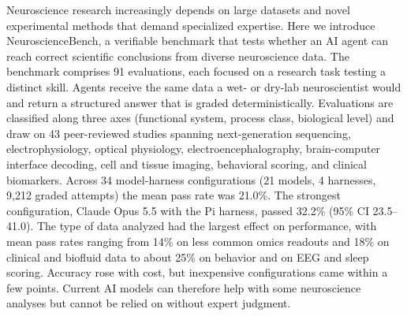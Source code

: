 Neuroscience research increasingly depends on large datasets and novel experimental methods that demand specialized expertise. Here we introduce NeuroscienceBench, a verifiable benchmark that tests whether an AI agent can reach correct scientific conclusions from diverse neuroscience data. The benchmark comprises 91 evaluations, each focused on a research task testing a distinct skill. Agents receive the same data a wet- or dry-lab neuroscientist would and return a structured answer that is graded deterministically. Evaluations are classified along three axes (functional system, process class, biological level) and draw on 43 peer-reviewed studies spanning next-generation sequencing, electrophysiology, optical physiology, electroencephalography, brain-computer interface decoding, cell and tissue imaging, behavioral scoring, and clinical biomarkers. Across 34 model-harness configurations (21 models, 4 harnesses, 9,212 graded attempts) the mean pass rate was 21.0\%. The strongest configuration, Claude Opus 5.5 with the Pi harness, passed 32.2\% (95\% CI \mbox{23.5--41.0}). The type of data analyzed had the largest effect on performance, with mean pass rates ranging from 14\% on less common omics readouts and 18\% on clinical and biofluid data to about 25\% on behavior and on EEG and sleep scoring. Accuracy rose with cost, but inexpensive configurations came within a few points. Current AI models can therefore help with some neuroscience analyses but cannot be relied on without expert judgment.
